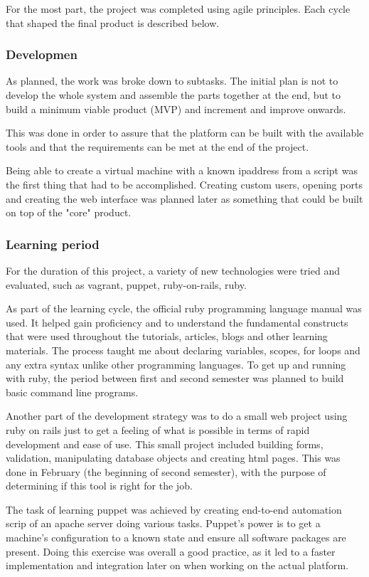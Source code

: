 \documentclass{article}
\begin{document}
\begin{appendices}
For the most part, the project was completed using agile principles. Each cycle that shaped the final product is described below.
\subsubsection{Developmen}
As planned, the work was broke down to subtasks. The initial plan is not to develop the whole system and assemble the parts together at the end, but to build a minimum viable product (MVP) and increment and improve onwards.

This was done in order to assure that the platform can be built with the available tools and that the requirements can be met at the end of the project.

Being able to create a virtual machine with a known \gls{ipaddress} from a script was the first thing that had to be accomplished. Creating custom users, opening ports and creating the web interface was planned later as something that could be built on top of the "core" product.

\subsubsection{Learning period}
For the duration of this project, a variety of new technologies were tried and evaluated, such as \gls{vagrant}, \gls{puppet}, \gls{ruby-on-rails}, \gls{ruby}.

As part of the learning cycle, the official ruby programming language manual was used. It helped gain proficiency and to understand the fundamental constructs that were used throughout the tutorials, articles, blogs and other learning materials. The process taught me about declaring variables, scopes, for loops and any extra syntax unlike other programming languages. To get up and running with \gls{ruby}, the period between first and second semester was planned to build basic command line programs.

Another part of the development strategy was to do a small web project using ruby on rails just to get a feeling of what is possible in terms of rapid development and ease of use. This small project included building forms, validation, manipulating database objects and creating \gls{html} pages. This was done in February (the beginning of second semester), with the purpose of determining if this tool is right for the job.

The task of learning \gls{puppet} was achieved by creating end-to-end automation scrip of an apache server doing various tasks. Puppet's power is to get a machine's configuration to a known state and ensure all software packages are present. Doing this exercise was overall a good practice, as it led to a faster implementation and integration later on when working on the actual platform.


\end{appendices}
\end{document}
